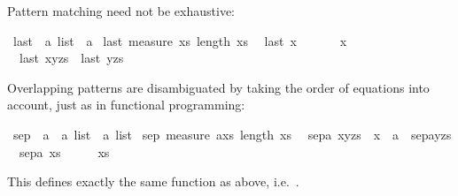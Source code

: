\begin{isabellebody}
\begin{isamarkuptext}
Pattern matching need not be exhaustive:%
\end{isamarkuptext}%
\ last\ {\isacharcolon}{\isacharcolon}\ {\isachardoublequote}{\isacharprime}a\ list\ {\isasymRightarrow}\ {\isacharprime}a{\isachardoublequote}\isanewline
{}\ last\ {\isachardoublequote}measure\ {\isacharparenleft}{\isasymlambda}xs{\isachardot}\ length\ xs{\isacharparenright}{\isachardoublequote}\isanewline
\ \ {\isachardoublequote}last\ {\isacharbrackleft}x{\isacharbrackright}\ \ \ \ \ \ {\isacharequal}\ x{\isachardoublequote}\isanewline
\ \ {\isachardoublequote}last\ {\isacharparenleft}x{\isacharhash}y{\isacharhash}zs{\isacharparenright}\ {\isacharequal}\ last\ {\isacharparenleft}y{\isacharhash}zs{\isacharparenright}{\isachardoublequote}%
\begin{isamarkuptext}%
Overlapping patterns are disambiguated by taking the order of equations into
account, just as in functional programming:%
\end{isamarkuptext}%
\ sep\ {\isacharcolon}{\isacharcolon}\ {\isachardoublequote}{\isacharprime}a\ {\isacharasterisk}\ {\isacharprime}a\ list\ {\isasymRightarrow}\ {\isacharprime}a\ list{\isachardoublequote}\isanewline
{}\ sep\ {\isachardoublequote}measure\ {\isacharparenleft}{\isasymlambda}{\isacharparenleft}a{\isacharcomma}xs{\isacharparenright}{\isachardot}\ length\ xs{\isacharparenright}{\isachardoublequote}\isanewline
\ \ {\isachardoublequote}sepa{\isacharcomma}\ x{\isacharhash}y{\isacharhash}zs{\isacharparenright}\ {\isacharequal}\ x\ {\isacharhash}\ a\ {\isacharhash}\ sepa{\isacharcomma}y{\isacharhash}zs{\isacharparenright}{\isachardoublequote}\isanewline
\ \ {\isachardoublequote}sepa{\isacharcomma}\ xs{\isacharparenright}\ \ \ \ \ {\isacharequal}\ xs{\isachardoublequote}%
\begin{isamarkuptext}%
\noindent
This defines exactly the same function as  above, i.e.\
.


\end{isamarkuptext}
\end{isabellebody}

